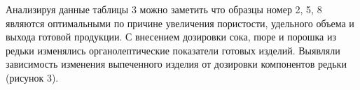 
Анализируя данные таблицы 3 можно заметить что образцы номер 2, 5, 8
являются оптимальными по причине увеличения пористости, удельного объема
и выхода готовой продукции. С внесением дозировки сока, пюре и порошка
из редьки изменялись органолептические показатели готовых изделий.
Выявляли зависимость изменения выпеченного изделия от дозировки
компонентов редьки (рисунок 3).



